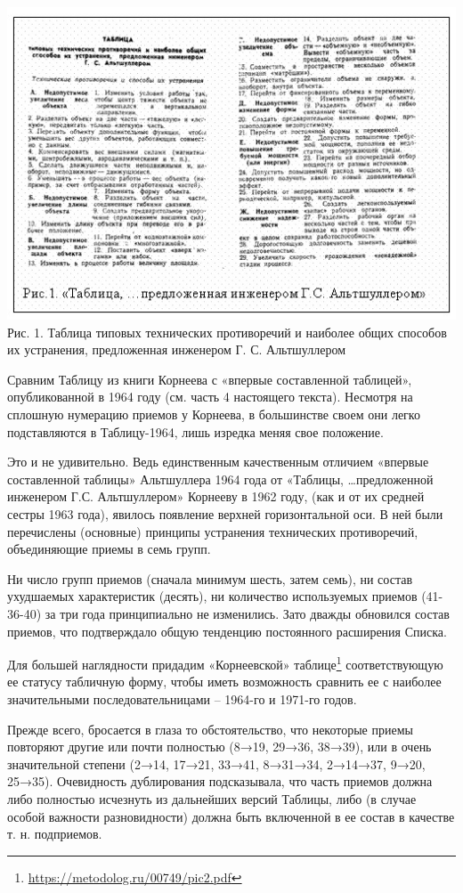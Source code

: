 \documentclass[11pt,a4paper]{article}
\begin{document}
\begin{center}
  \includegraphics[width=.8\textwidth]{./10.jpg} \\
Рис. 1. Таблица типовых технических противоречий и наиболее общих способов их
устранения, предложенная инженером Г. С. Альтшуллером
\end{center}

Сравним Таблицу из книги Корнеева с «впервые составленной таблицей»,
опубликованной в 1964 году (см. часть 4 настоящего текста). Несмотря на
сплошную нумерацию приемов у Корнеева, в большинстве своем они легко
подставляются в Таблицу-1964, лишь изредка меняя свое положение.

Это и не удивительно. Ведь единственным качественным отличием «впервые
составленной таблицы» Альтшуллера 1964 года от «Таблицы, …предложенной
инженером Г.С. Альтшуллером» Корнееву в 1962 году, (как и от их средней сестры
1963 года), явилось появление верхней горизонтальной оси. В ней были
перечислены (основные) принципы устранения технических противоречий,
объединяющие приемы в семь групп.

Ни число групп приемов (сначала минимум шесть, затем семь), ни состав
ухудшаемых характеристик (десять), ни количество используемых приемов
(41-36-40) за три года принципиально не изменились. Зато дважды обновился
состав приемов, что подтверждало общую тенденцию постоянного расширения
Списка.

Для большей наглядности придадим «Корнеевской»
таблице\footnote{\url{https://metodolog.ru/00749/pic2.pdf}} соответствующую ее
статусу табличную форму, чтобы иметь возможность сравнить ее с наиболее
значительными последовательницами -- 1964-го и 1971-го годов.

Прежде всего, бросается в глаза то обстоятельство, что некоторые приемы
повторяют другие или почти полностью (8→19, 29→36, 38→39), или в очень
значительной степени (2→14, 17→21, 33→41, 8→31→34, 2→14→37, 9→20, 25→35).
Очевидность дублирования подсказывала, что часть приемов должна либо полностью
исчезнуть из дальнейших версий Таблицы, либо (в случае особой важности
разновидности) должна быть включенной в ее состав в качестве т. н. подприемов.
\end{document}
